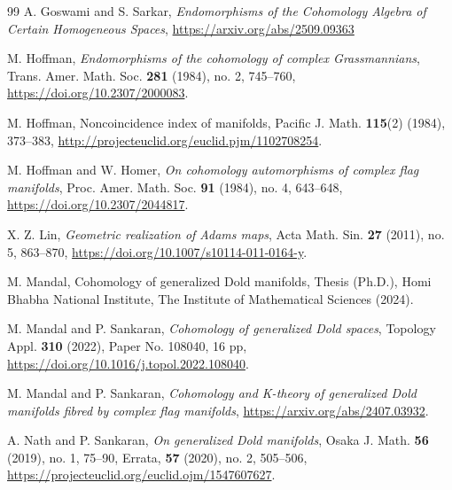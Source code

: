 \documentclass{amsart}
\begin{document}
\begin{thebibliography}{99}
 A. Goswami and S. Sarkar, \textit{Endomorphisms of the Cohomology Algebra of Certain Homogeneous Spaces}, \url{https://arxiv.org/abs/2509.09363}

 M. Hoffman, \textit{Endomorphisms of the cohomology of complex Grassmannians}, Trans. Amer. Math. Soc. \textbf{281} (1984), no. 2, 745--760, \url{https://doi.org/10.2307/2000083}.

 M. Hoffman, Noncoincidence index of manifolds, Pacific J. Math. \textbf{115}(2) (1984), 373--383, \url{http://projecteuclid.org/euclid.pjm/1102708254}.

 M. Hoffman and W. Homer, \textit{On cohomology automorphisms of complex flag manifolds}, Proc. Amer. Math. Soc. \textbf{91} (1984), no. 4, 643--648, \url{https://doi.org/10.2307/2044817}.

    
 X. Z. Lin, \textit{Geometric realization of Adams maps}, Acta Math. Sin. \textbf{27} (2011), no. 5, 863--870, \url{https://doi.org/10.1007/s10114-011-0164-y}.

 M. %
Mandal, Cohomology of generalized Dold manifolds, Thesis %
(Ph.D.), %
Homi Bhabha National %
Institute, The Institute of Mathematical Sciences (2024).
	
 M. Mandal and P. Sankaran, \textit{Cohomology of generalized Dold spaces}, Topology Appl. \textbf{310} (2022), Paper No. 108040, 16 pp, \url{https://doi.org/10.1016/j.topol.2022.108040}.
    
 M. Mandal and P. Sankaran, \textit{Cohomology and K-theory of generalized Dold manifolds fibred by complex flag manifolds}, \url{https://arxiv.org/abs/2407.03932}.
	
 A. Nath and P. Sankaran, \textit{On generalized Dold manifolds}, Osaka J. Math. \textbf{56} (2019), no. 1, 75--90, Errata, \textbf{57} (2020), no. 2, 505--506, \url{https://projecteuclid.org/euclid.ojm/1547607627}.
	

\end{thebibliography}
\end{document}
